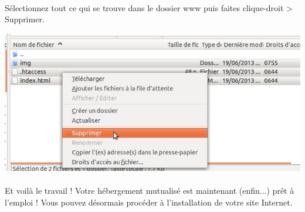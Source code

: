 \documentclass[10pt,a4paper]{article}
\begin{document}
\paragraph{}Sélectionnez tout ce qui se trouve dans le dossier www puis faites clique-droit > Supprimer.
\begin{center}
\includegraphics[scale=0.25]{img/0297.png}
\end{center}
\paragraph{}Et voilà le travail ! Votre hébergement mutualisé est maintenant (enfin...) prêt à l'emploi ! Vous pouvez désormais procéder à l'installation de votre site Internet.
\newpage
\end{document}
